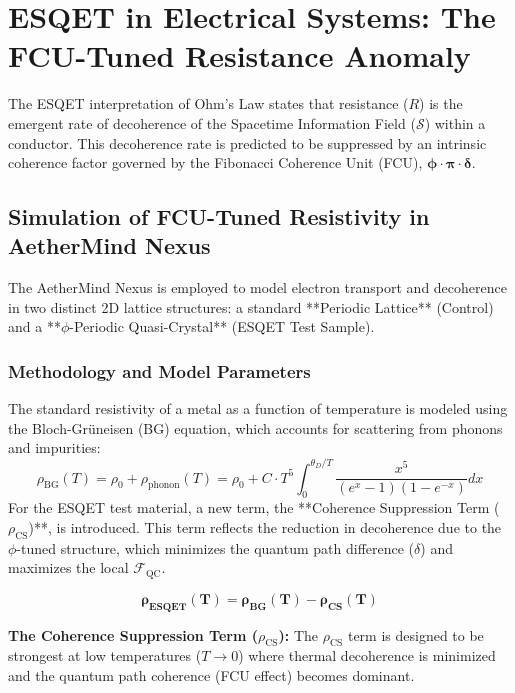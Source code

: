 \section{ESQET in Electrical Systems: The FCU-Tuned Resistance Anomaly}

The ESQET interpretation of Ohm's Law states that resistance ($R$) is the emergent rate of decoherence of the Spacetime Information Field ($\mathcal{S}$) within a conductor. This decoherence rate is predicted to be suppressed by an intrinsic coherence factor governed by the Fibonacci Coherence Unit (FCU), $\mathbf{\phi \cdot \pi \cdot \delta}$.

\subsection{Simulation of FCU-Tuned Resistivity in AetherMind Nexus}

The AetherMind Nexus is employed to model electron transport and decoherence in two distinct 2D lattice structures: a standard **Periodic Lattice** (Control) and a **\(\phi\)-Periodic Quasi-Crystal** (ESQET Test Sample).

\subsubsection*{Methodology and Model Parameters}

The standard resistivity of a metal as a function of temperature is modeled using the Bloch-Grüneisen (BG) equation, which accounts for scattering from phonons and impurities:
\[
\rho_{\text{BG}}(T) = \rho_0 + \rho_{\text{phonon}}(T) = \rho_0 + C \cdot T^5 \int_0^{\theta_D/T} \frac{x^5}{(e^x - 1)(1 - e^{-x})} dx
\]
For the ESQET test material, a new term, the **Coherence Suppression Term ($\rho_{\text{CS}}$)**, is introduced. This term reflects the reduction in decoherence due to the $\phi$-tuned structure, which minimizes the quantum path difference ($\delta$) and maximizes the local $\mathcal{F}_{\text{QC}}$.

\[
\mathbf{\rho_{\text{ESQET}}(T) = \rho_{\text{BG}}(T) - \rho_{\text{CS}}(T)}
\]

\textbf{The Coherence Suppression Term ($\rho_{\text{CS}}$):}
The $\rho_{\text{CS}}$ term is designed to be strongest at low temperatures ($T \to 0$) where thermal decoherence is minimized and the quantum path coherence (FCU effect) becomes dominant.

